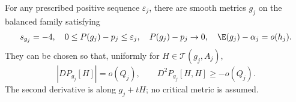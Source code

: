 \begin{proposition}
\label{webvar:selection}
For any prescribed positive sequence $\varepsilon_j$, there are
smooth metrics $g_j$ on the balanced family satisfying
\begin{equation}\label{webvar:selection-energy}
 s_{g_j}=-4,\quad 0\le P(g_j)-p_j\le\varepsilon_j,\quad
 P(g_j)-p_j\to0,\quad \E(g_j)-\alpha_j=o(h_j).
\end{equation}
They can be chosen so that, uniformly for $H\in\mathcal T(g_j,A_j)$,
\begin{equation}\label{webvar:selection-variations}
 |DP_{g_j}[H]|=o(Q_j),\qquad D^2P_{g_j}[H,H]\ge-o(Q_j).
\end{equation}
The second derivative is along $g_j+tH$; no critical metric is assumed.
\end{proposition}
